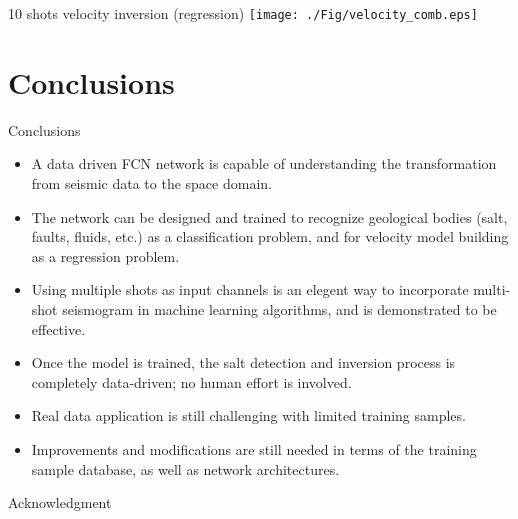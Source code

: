 \documentclass[aspectratio=169]{beamer}
\begin{document}
\begin{frame}{10 shots velocity inversion (regression)}
\centering
 \texttt{[image: ./Fig/velocity\_comb.eps]}
\end{frame}
\section{Conclusions}
\begin{frame}{Conclusions}
\begin{itemize}
\item{A data driven FCN network is capable of understanding the transformation from seismic data to the space domain.}
\item{The network can be designed and trained to recognize geological bodies (salt, faults, fluids, etc.) as a classification problem, and for velocity model building as a regression problem.}
\item{Using multiple shots as input channels is an elegent way to incorporate multi-shot seismogram in machine learning algorithms, and is demonstrated to be effective.}
\item{Once the model is trained, the salt detection and inversion process is completely data-driven; no human effort is involved.}
\item{Real data application is still challenging with limited training samples.}
\item{Improvements and modifications are still needed in terms of the training sample database, as well as network architectures.}
\end{itemize}
\end{frame}
\begin{frame}{Acknowledgment}
\end{frame}


\end{document}
